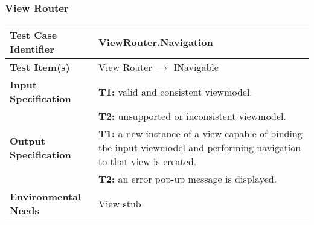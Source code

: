 {\subsubsection{View Router}
\noindent
\begin{tabularx}{\textwidth}{l X}
    \hline 
    \textbf{Test Case Identifier} & ViewRouter.Navigation\\ 
    \hline 
    
    \textbf{Test Item(s)} & View Router $\rightarrow$ INavigable\\
    \hline 
    
    \textbf{Input Specification} & \textbf{T1:} valid and consistent viewmodel.\\
                                & \textbf{T2:} unsupported or inconsistent viewmodel.\\
    \hline 
    
    \textbf{Output Specification} & \textbf{T1:} a new instance of a view capable of binding the input viewmodel and performing navigation to that view is created.\\
                                & \textbf{T2:} an error pop-up message is displayed.\\
    \hline 
    
    \textbf{Environmental Needs} & View stub\\
    \hline
\end{tabularx}
\bigskip 

}